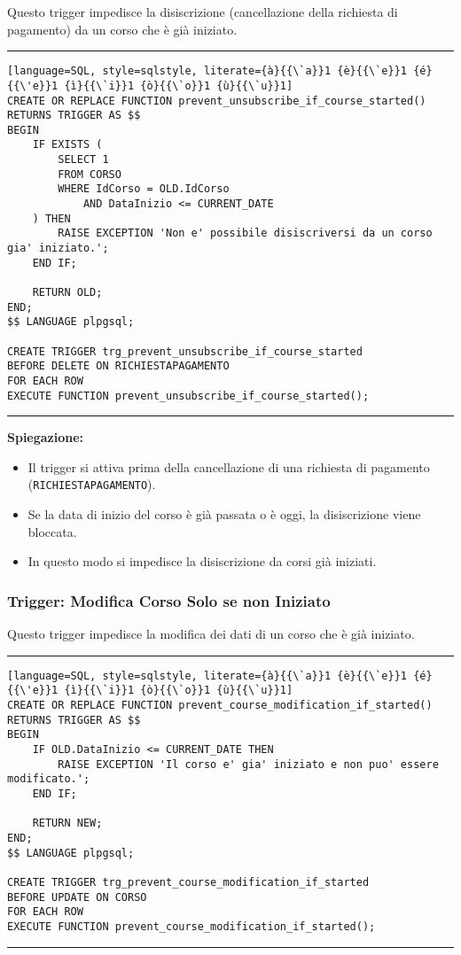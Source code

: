 Questo trigger impedisce la disiscrizione (cancellazione della richiesta di pagamento) da un corso che è già iniziato.

\noindent\rule{\textwidth}{0.4pt}
\begin{lstlisting}[language=SQL, style=sqlstyle, literate={à}{{\`a}}1 {è}{{\`e}}1 {é}{{\'e}}1 {ì}{{\`i}}1 {ò}{{\`o}}1 {ù}{{\`u}}1]
CREATE OR REPLACE FUNCTION prevent_unsubscribe_if_course_started()
RETURNS TRIGGER AS $$
BEGIN
    IF EXISTS (
        SELECT 1
        FROM CORSO
        WHERE IdCorso = OLD.IdCorso
            AND DataInizio <= CURRENT_DATE
    ) THEN
        RAISE EXCEPTION 'Non e' possibile disiscriversi da un corso gia' iniziato.';
    END IF;

    RETURN OLD;
END;
$$ LANGUAGE plpgsql;

CREATE TRIGGER trg_prevent_unsubscribe_if_course_started
BEFORE DELETE ON RICHIESTAPAGAMENTO
FOR EACH ROW
EXECUTE FUNCTION prevent_unsubscribe_if_course_started();
\end{lstlisting}
\noindent\rule{\textwidth}{0.4pt}

\textbf{Spiegazione:}
\begin{itemize}
        \item Il trigger si attiva prima della cancellazione di una richiesta di pagamento (\texttt{RICHIESTAPAGAMENTO}).
        \item Se la data di inizio del corso è già passata o è oggi, la disiscrizione viene bloccata.
        \item In questo modo si impedisce la disiscrizione da corsi già iniziati.
\end{itemize}

\subsubsection{Trigger: Modifica Corso Solo se non Iniziato}

Questo trigger impedisce la modifica dei dati di un corso che è già iniziato.

\noindent\rule{\textwidth}{0.4pt}
\begin{lstlisting}[language=SQL, style=sqlstyle, literate={à}{{\`a}}1 {è}{{\`e}}1 {é}{{\'e}}1 {ì}{{\`i}}1 {ò}{{\`o}}1 {ù}{{\`u}}1]
CREATE OR REPLACE FUNCTION prevent_course_modification_if_started()
RETURNS TRIGGER AS $$
BEGIN
    IF OLD.DataInizio <= CURRENT_DATE THEN
        RAISE EXCEPTION 'Il corso e' gia' iniziato e non puo' essere modificato.';
    END IF;

    RETURN NEW;
END;
$$ LANGUAGE plpgsql;

CREATE TRIGGER trg_prevent_course_modification_if_started
BEFORE UPDATE ON CORSO
FOR EACH ROW
EXECUTE FUNCTION prevent_course_modification_if_started();
\end{lstlisting}
\noindent\rule{\textwidth}{0.4pt}

